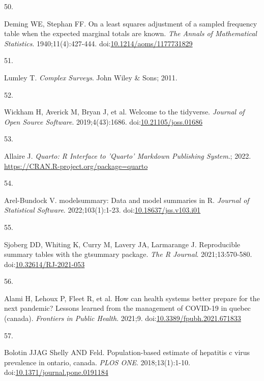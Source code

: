 \documentclass[
]{article}
\newlength{\cslhangindent}
\newlength{\csllabelwidth}
\newlength{\cslentryspacingunit} %
\newenvironment{CSLReferences}[2] %
 {%
  \setlength{\parindent}{0pt}
  \ifodd #1
  \let\oldpar\par
  \def\par{\hangindent=\cslhangindent\oldpar}
  \fi
  \setlength{\parskip}{#2\cslentryspacingunit}
 }%
 {}
\newcommand{\CSLLeftMargin}[1]{\parbox[t]{\csllabelwidth}{#1}}
\newcommand{\CSLRightInline}[1]{\parbox[t]{\linewidth - \csllabelwidth}{#1}\break}
\begin{document}
\begin{CSLReferences}{0}{0}
\leavevmode{}%
\CSLLeftMargin{50. }%
\CSLRightInline{Deming WE, Stephan FF. On a least squares adjustment of
a sampled frequency table when the expected marginal totals are known.
\emph{The Annals of Mathematical Statistics}. 1940;11(4):427-444.
doi:\href{https://doi.org/10.1214/aoms/1177731829}{10.1214/aoms/1177731829}}

\leavevmode{}%
\CSLLeftMargin{51. }%
\CSLRightInline{Lumley T. \emph{Complex Surveys}. John Wiley \& Sons;
2011.}

\leavevmode{}%
\CSLLeftMargin{52. }%
\CSLRightInline{Wickham H, Averick M, Bryan J, et al. Welcome to the
{tidyverse}. \emph{Journal of Open Source Software}. 2019;4(43):1686.
doi:\href{https://doi.org/10.21105/joss.01686}{10.21105/joss.01686}}

\leavevmode{}%
\CSLLeftMargin{53. }%
\CSLRightInline{Allaire J. \emph{Quarto: R Interface to 'Quarto'
Markdown Publishing System}.; 2022.
\url{https://CRAN.R-project.org/package=quarto}}

\leavevmode{}%
\CSLLeftMargin{54. }%
\CSLRightInline{Arel-Bundock V. {modelsummary}: Data and model summaries
in {R}. \emph{Journal of Statistical Software}. 2022;103(1):1-23.
doi:\href{https://doi.org/10.18637/jss.v103.i01}{10.18637/jss.v103.i01}}

\leavevmode{}%
\CSLLeftMargin{55. }%
\CSLRightInline{Sjoberg DD, Whiting K, Curry M, Lavery JA, Larmarange J.
Reproducible summary tables with the gtsummary package. \emph{{The R
Journal}}. 2021;13:570-580.
doi:\href{https://doi.org/10.32614/RJ-2021-053}{10.32614/RJ-2021-053}}

\leavevmode{}%
\CSLLeftMargin{56. }%
\CSLRightInline{Alami H, Lehoux P, Fleet R, et al. How can health
systems better prepare for the next pandemic? Lessons learned from the
management of {COVID}-19 in quebec (canada). \emph{Frontiers in Public
Health}. 2021;9.
doi:\href{https://doi.org/10.3389/fpubh.2021.671833}{10.3389/fpubh.2021.671833}}

\leavevmode{}%
\CSLLeftMargin{57. }%
\CSLRightInline{Bolotin JJAG Shelly AND Feld. Population-based estimate
of hepatitis c virus prevalence in ontario, canada. \emph{PLOS ONE}.
2018;13(1):1-10.
doi:\href{https://doi.org/10.1371/journal.pone.0191184}{10.1371/journal.pone.0191184}}


\end{CSLReferences}
\end{document}
